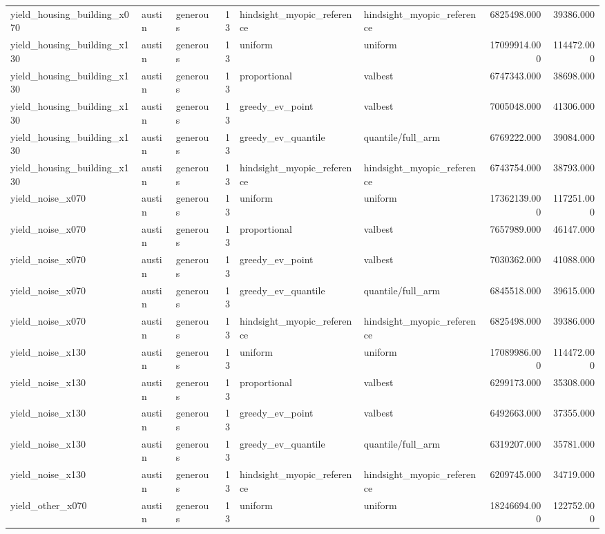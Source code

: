 \begin{tabular}{lllrllrr}
yield\_housing\_building\_x070 & austin & generous & 13 & hindsight\_myopic\_reference & hindsight\_myopic\_reference & 6825498.000 & 39386.000 \\
yield\_housing\_building\_x130 & austin & generous & 13 & uniform & uniform & 17099914.000 & 114472.000 \\
yield\_housing\_building\_x130 & austin & generous & 13 & proportional & valbest & 6747343.000 & 38698.000 \\
yield\_housing\_building\_x130 & austin & generous & 13 & greedy\_ev\_point & valbest & 7005048.000 & 41306.000 \\
yield\_housing\_building\_x130 & austin & generous & 13 & greedy\_ev\_quantile & quantile/full\_arm & 6769222.000 & 39084.000 \\
yield\_housing\_building\_x130 & austin & generous & 13 & hindsight\_myopic\_reference & hindsight\_myopic\_reference & 6743754.000 & 38793.000 \\
yield\_noise\_x070 & austin & generous & 13 & uniform & uniform & 17362139.000 & 117251.000 \\
yield\_noise\_x070 & austin & generous & 13 & proportional & valbest & 7657989.000 & 46147.000 \\
yield\_noise\_x070 & austin & generous & 13 & greedy\_ev\_point & valbest & 7030362.000 & 41088.000 \\
yield\_noise\_x070 & austin & generous & 13 & greedy\_ev\_quantile & quantile/full\_arm & 6845518.000 & 39615.000 \\
yield\_noise\_x070 & austin & generous & 13 & hindsight\_myopic\_reference & hindsight\_myopic\_reference & 6825498.000 & 39386.000 \\
yield\_noise\_x130 & austin & generous & 13 & uniform & uniform & 17089986.000 & 114472.000 \\
yield\_noise\_x130 & austin & generous & 13 & proportional & valbest & 6299173.000 & 35308.000 \\
yield\_noise\_x130 & austin & generous & 13 & greedy\_ev\_point & valbest & 6492663.000 & 37355.000 \\
yield\_noise\_x130 & austin & generous & 13 & greedy\_ev\_quantile & quantile/full\_arm & 6319207.000 & 35781.000 \\
yield\_noise\_x130 & austin & generous & 13 & hindsight\_myopic\_reference & hindsight\_myopic\_reference & 6209745.000 & 34719.000 \\
yield\_other\_x070 & austin & generous & 13 & uniform & uniform & 18246694.000 & 122752.000 \\

\end{tabular}
